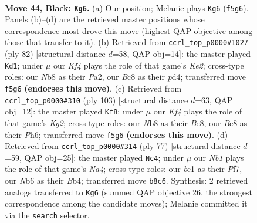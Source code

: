 \documentclass[11pt]{article}
\begin{document}
\clearpage

\begin{figure}[p]\centering
\begin{subfigure}{0.46\textwidth}\centering
\resizebox{\linewidth}{!}{%
\newchessgame
\chessboard[
  setfen={1nb2b2/1p6/1n6/pN1p1kp1/7p/PP2PK1P/4P3/2BB4 b - - 1 44},
  showmover=false,
  pgfstyle=straightmove, color=movearrow, markmove={f5-g6}
]}
\caption{}
\end{subfigure}\hfill
\begin{subfigure}{0.46\textwidth}\centering
\resizebox{\linewidth}{!}{%
\newchessgame
\chessboard[
  setfen={8/8/2b1p1pk/p1b1P2p/1p1pPP2/3B2PP/P2NK3/8 w - - 6 42},
  showmover=false,
  pgfstyle=straightmove, color=movearrow, markmove={e2-d1}
]}
\caption{}
\end{subfigure}
\\[4pt]
\begin{subfigure}{0.46\textwidth}\centering
\resizebox{\linewidth}{!}{%
\newchessgame
\chessboard[
  setfen={4b3/6k1/1p2p2p/1P1pPp2/n2B1P2/5PKP/8/5B2 b - - 1 52},
  showmover=false,
  pgfstyle=straightmove, color=movearrow, markmove={g7-f8}
]}
\caption{}
\end{subfigure}\hfill
\begin{subfigure}{0.46\textwidth}\centering
\resizebox{\linewidth}{!}{%
\newchessgame
\chessboard[
  setfen={8/3bkp2/3p2pp/n2Pp3/Pb2P1PP/5K2/2B2P2/3N1N2 b - - 2 39},
  showmover=false,
  pgfstyle=straightmove, color=movearrow, markmove={a5-c4}
]}
\caption{}
\end{subfigure}
\caption{\textbf{Move 44, Black: \texttt{Kg6}.} (a) Our position; Melanie plays \texttt{Kg6} (\texttt{f5g6}). Panels (b)--(d) are the retrieved master positions whose correspondence most drove this move (highest QAP objective among those that transfer to it). (b) Retrieved from \texttt{ccrl\_top\_p0000\#1027} (ply 82) [structural distance $d$=58, QAP obj=14]: the master played \texttt{Kd1}; under $\mu$ our \emph{Kf4} plays the role of that game's \emph{Ke2}; cross-type roles: our \emph{N}b8 as their \emph{P}a2, our \emph{B}c8 as their \emph{p}d4; transferred move \texttt{f5g6} \textbf{(endorses this move)}. (c) Retrieved from \texttt{ccrl\_top\_p0000\#310} (ply 103) [structural distance $d$=63, QAP obj=12]: the master played \texttt{Kf8}; under $\mu$ our \emph{Kf4} plays the role of that game's \emph{Kg2}; cross-type roles: our \emph{N}b8 as their \emph{B}e8, our \emph{B}c8 as their \emph{P}h6; transferred move \texttt{f5g6} \textbf{(endorses this move)}. (d) Retrieved from \texttt{ccrl\_top\_p0000\#314} (ply 77) [structural distance $d$=59, QAP obj=25]: the master played \texttt{Nc4}; under $\mu$ our \emph{Nb1} plays the role of that game's \emph{Na4}; cross-type roles: our \emph{b}c1 as their \emph{P}f7, our \emph{N}b6 as their \emph{B}b4; transferred move \texttt{b8c6}. Synthesis: 2 retrieved analogs transferred to \texttt{Kg6} (summed QAP objective 26, the strongest correspondence among the candidate moves); Melanie committed it via the \texttt{search} selector.}
\label{fig:thought-m87}
\end{figure}
\end{document}
